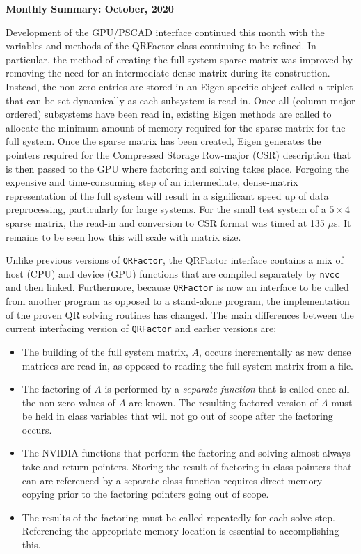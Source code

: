\documentclass[11pt,letterpaper]{article}
\newcommand{\qrf}{\texttt{QRFactor}}
\begin{document}
\begin{center}
    {\Large \bf Monthly Summary: October, 2020}
\end{center}

Development of the GPU/PSCAD interface continued this month with the variables and methods of the QRFactor class continuing to be refined. In particular, the method of creating the full system sparse matrix was improved by removing the need for an intermediate dense matrix during its construction. Instead, the non-zero entries are stored in an Eigen-specific object called a triplet that can be set dynamically as each subsystem is read in. Once all (column-major ordered) subsystems have been read in, existing Eigen methods are called to allocate the minimum amount of memory required for the sparse matrix for the full system. Once the sparse matrix has been created, Eigen generates the pointers required for the Compressed Storage Row-major (CSR) description that is then passed to the GPU where factoring and solving takes place. Forgoing the expensive and time-consuming step of an intermediate, dense-matrix representation of the full system will result in a significant speed up of data preprocessing, particularly for large systems. For the small test system of a $5\times 4$ sparse matrix, the read-in and conversion to CSR format was timed at 135 $\mu$s. It remains to be seen how this will scale with matrix size.

Unlike previous versions of \qrf\!, the QRFactor interface contains a mix of host (CPU) and device (GPU) functions that are compiled separately by \verb+nvcc+ and then linked. Furthermore, because \qrf\! is now an interface to be called from another program as opposed to a stand-alone program, the implementation of the proven QR solving routines has changed. The main differences between the current interfacing version of \qrf\! and earlier versions are:
\begin{itemize}
    \item The building of the full system matrix, $A$, occurs incrementally as new dense matrices are read in, as opposed to reading the full system matrix from a file.
    \item The factoring of $A$ is performed by a \emph{separate function} that is called once all the non-zero values of $A$ are known. The resulting factored version of $A$ must be held in class variables that will not go out of scope after the factoring occurs.
    \item The NVIDIA functions that perform the factoring and solving almost always take and return pointers. Storing the result of factoring in class pointers that can are referenced by a separate class function requires direct memory copying prior to the factoring pointers going out of scope.
    \item The results of the factoring must be called repeatedly for each solve step. Referencing the appropriate memory location is essential to accomplishing this.
\end{itemize}
\end{document}
